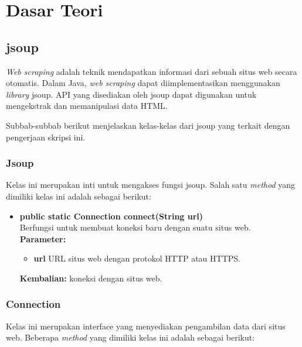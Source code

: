 \chapter{Dasar Teori}
\label{chap:Dasar Teori}

\section{jsoup}
\label{sec:jsoup}

\textit{Web scraping}\cite{Vargiu:2013} adalah teknik mendapatkan informasi dari sebuah situs web secara otomatis. Dalam Java, \textit{web scraping} dapat diimplementasikan menggunakan \textit{library} jsoup\cite{jsoup}. API yang disediakan oleh jsoup dapat digunakan untuk mengekstrak dan memanipulasi data HTML. 

Subbab-subbab berikut menjelaskan kelas-kelas dari jsoup yang terkait dengan pengerjaan skripsi ini.

\subsection{Jsoup}

Kelas ini merupakan inti untuk mengakses fungsi jsoup. Salah satu \textit{method} yang dimiliki kelas ini adalah sebagai berikut:
\begin{itemize}
	\item \textbf{public static Connection connect(String url)} \\
		Berfungsi untuk membuat koneksi baru dengan suatu situs web. \\
		\textbf{Parameter:}
		\begin{itemize}
			\item \textbf{url} URL situs web dengan protokol HTTP atau HTTPS.
		\end{itemize}
		\textbf{Kembalian:} koneksi dengan situs web.
\end{itemize}

\subsection{Connection}

Kelas ini merupakan interface yang menyediakan pengambilan data dari situs web. Beberapa \textit{method} yang dimiliki kelas ini adalah sebagai berikut:

